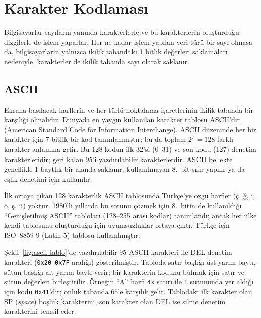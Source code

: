 \section{Karakter Kodlaması}
\label{sec:karakter-kodlama}

Bilgisayarlar sayıların yanında karakterlerle ve bu karakterlerin oluşturduğu dizgilerle de işlem yaparlar. Her ne kadar işlem yapılan veri türü bir sayı olmasa da, bilgisayarların yalnızca ikilik tabandaki 1 bitlik değerleri saklamaları nedeniyle, karakterler de ikilik tabanda sayı olarak saklanır.

\subsection{ASCII}
\label{sec:ascii}

Ekrana basılacak harflerin ve her türlü noktalama işaretlerinin ikilik tabanda bir karşılığı olmalıdır. Dünyada en yaygın kullanılan karakter tablosu ASCII'dir (American Standard Code for Information Interchange). ASCII düzeninde her bir karakter için 7 bitlik bir kod tanımlanmıştır; bu da toplam $2^7 = 128$ farklı karakter anlamına gelir. Bu 128 kodun ilk 32'si (0--31) ve son kodu (127) denetim karakterleridir; geri kalan 95'i yazdırılabilir karakterlerdir. ASCII bellekte genellikle 1 baytlık bir alanda saklanır; kullanılmayan 8.~bit sıfır yapılır ya da eşlik denetimi için kullanılır.

İlk ortaya çıkan 128 karakterlik ASCII tablosunda Türkçe'ye özgü harfler (ç, ğ, ı, ö, ş, ü) yoktur. 1980'li yıllarda bu sorunu çözmek için 8.~bitin de kullanıldığı ``Genişletilmiş ASCII'' tabloları (128--255 arası kodlar) tanımlandı; ancak her ülke kendi tablosunu oluşturduğu için uyumsuzluklar ortaya çıktı. Türkçe için ISO~8859-9 (Latin-5) tablosu kullanılmıştır.

Şekil~\ref{fig:ascii-tablo}'de yazdırılabilir 95 ASCII karakteri ile DEL denetim karakteri (\texttt{0x20}--\texttt{0x7F} aralığı) gösterilmiştir. Tabloda satır başlığı üst yarım baytı, sütun başlığı alt yarım baytı verir; bir karakterin kodunu bulmak için satır ve sütun değerleri birleştirilir. Örneğin ``A'' harfi \texttt{4x} satırı ile \texttt{1} sütununda yer aldığı için kodu \texttt{0x41}'dir; onluk tabanda $65$'e karşılık gelir. Tablodaki ilk karakter olan SP (\textit{space}) boşluk karakterini, son karakter olan DEL ise silme denetim karakterini temsil eder.


